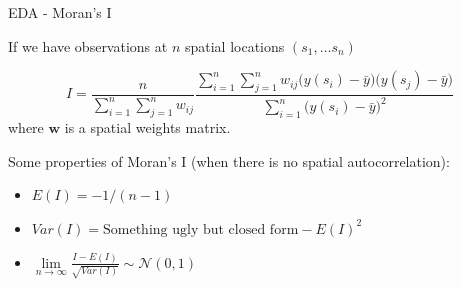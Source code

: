 \documentclass[11pt,ignorenonframetext,]{beamer}
\providecommand{\tightlist}{%
  \setlength{\itemsep}{0pt}\setlength{\parskip}{0pt}}
\begin{document}
\begin{frame}[t]{EDA - Moran’s I}
\protect\hypertarget{eda---morans-i}{}

If we have observations at \(n\) spatial locations \((s_1, \ldots s_n)\)

\[ I = \frac{n}{\sum_{i=1}^n \sum_{j=1}^n w_{ij}} \frac{\sum_{i=1}^n \sum_{j=1}^n w_{ij} \big(y(s_i)-\bar{y}\big)\big(y(s_j)-\bar{y}\big)}{\sum_{i=1}^n \big(y(s_i) - \bar{y}\big)^2} \]
where \(\symbf{w}\) is a spatial weights matrix.

\pause

\vspace{3mm}

Some properties of Moran’s I (when there is no spatial autocorrelation):

\begin{itemize}
\tightlist
\item
  \(E(I) = -1 / (n-1)\)
\end{itemize}

\vspace{2mm}

\begin{itemize}
\tightlist
\item
  \(Var(I) = \text{Something ugly but closed form}- E(I)^2\)
\end{itemize}

\vspace{2mm}

\begin{itemize}
\tightlist
\item
  \(\underset{n\to\infty}{\lim} \frac{I - E(I)}{\sqrt{Var(I)}} \sim \mathcal{N}(0,1)\)
\end{itemize}

\end{frame}
\end{document}
